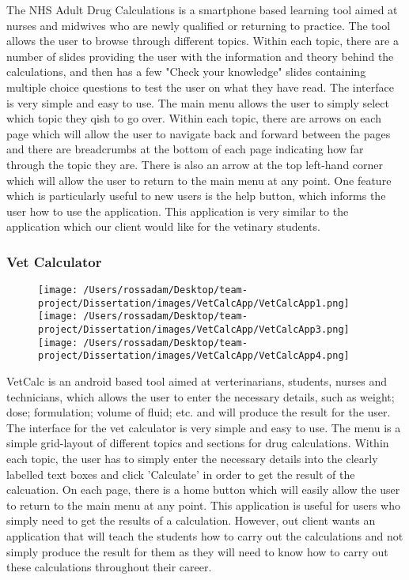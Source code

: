 \documentclass{l3proj}
\begin{document}
The NHS Adult Drug Calculations is a smartphone based learning tool aimed at nurses and midwives who are newly qualified or returning to practice. The tool allows the user to browse through different topics. Within each topic, there are a number of slides providing the user with the information and theory behind the calculations, and then has a few "Check your knowledge" slides containing multiple choice questions to test the user on what they have read. The interface is very simple and easy to use. The main menu allows the user to simply select which topic they qish to go over. Within each topic, there are arrows on each page which will allow the user to navigate back and forward between the pages and there are breadcrumbs at the bottom of each page indicating how far through the topic they are.  There is also an arrow at the top left-hand corner which will allow the user to return to the main menu at any point. One feature which is particularly useful to new users is the help button, which informs the user how to use the application. This application is very similar to the application which our client would like for the vetinary students.

\subsubsection{Vet Calculator}

\begin{figure}[!htb]
  \texttt{[image: /Users/rossadam/Desktop/team-project/Dissertation/images/VetCalcApp/VetCalcApp1.png]}
\endminipage\hfill
{}
  \texttt{[image: /Users/rossadam/Desktop/team-project/Dissertation/images/VetCalcApp/VetCalcApp3.png]}
\endminipage\hfill
{}%
  \texttt{[image: /Users/rossadam/Desktop/team-project/Dissertation/images/VetCalcApp/VetCalcApp4.png]}
\endminipage
\end{figure}

VetCalc is an android based tool aimed at verterinarians, students, nurses and technicians, which allows the user to enter the necessary details, such as weight; dose; formulation; volume of fluid; etc. and will produce the result for the user. The interface for the vet calculator is very simple and easy to use. The menu is a simple grid-layout of different topics and sections for drug calculations. Within each topic, the user has to simply enter the necessary details into the clearly labelled text boxes and click 'Calculate' in order to get the result of the calcuation. On each page, there is a home button which will easily allow the user to return to the main menu at any point. This application is useful for users who simply need to get the results of a calculation. However, out client wants an application that will teach the students how to carry out the calculations and not simply produce the result for them as they will need to know how to carry out these calculations throughout their career.
\end{document}
